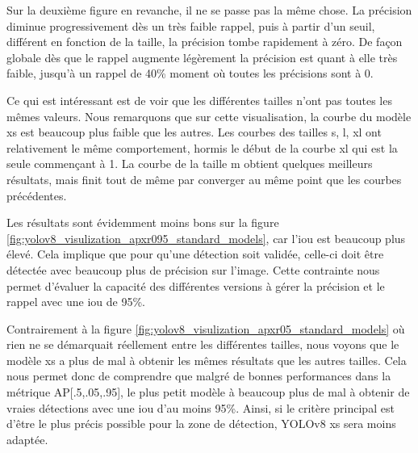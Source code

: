 Sur la deuxième figure en revanche, il ne se passe pas la même chose. La précision diminue progressivement dès un très faible rappel, puis à partir d'un seuil, différent en fonction de la taille, la précision tombe rapidement à zéro. De façon globale dès que le rappel augmente légèrement la précision est quant à elle très faible, jusqu'à un rappel de 40\% moment où toutes les précisions sont à 0.

Ce qui est intéressant est de voir que les différentes tailles n'ont pas toutes les mêmes valeurs. Nous remarquons que sur cette visualisation, la courbe du modèle xs est beaucoup plus faible que les autres. Les courbes des tailles s, l, xl ont relativement le même comportement, hormis le début de la courbe xl qui est la seule commençant à 1. La courbe de la taille m obtient quelques meilleurs résultats, mais finit tout de même par converger au même point que les courbes précédentes.

Les résultats sont évidemment moins bons sur la figure \ref{fig:yolov8_visulization_apxr095_standard_models}, car l'\acrshort{iou} est beaucoup plus élevé. Cela implique que pour qu'une détection soit validée, celle-ci doit être détectée avec beaucoup plus de précision sur l'image. Cette contrainte nous permet d'évaluer la capacité des différentes versions à gérer la précision et le rappel avec une \acrshort{iou} de 95\%.

Contrairement à la figure \ref{fig:yolov8_visulization_apxr05_standard_models} où rien ne se démarquait réellement entre les différentes tailles, nous voyons que le modèle xs a plus de mal à obtenir les mêmes résultats que les autres tailles. Cela nous permet donc de comprendre que malgré de bonnes performances dans la métrique AP[.5,.05,.95], le plus petit modèle à beaucoup plus de mal à obtenir de vraies détections avec une \acrshort{iou} d'au moins 95\%. Ainsi, si le critère principal est d'être le plus précis possible pour la zone de détection, YOLOv8 xs sera moins adaptée.

